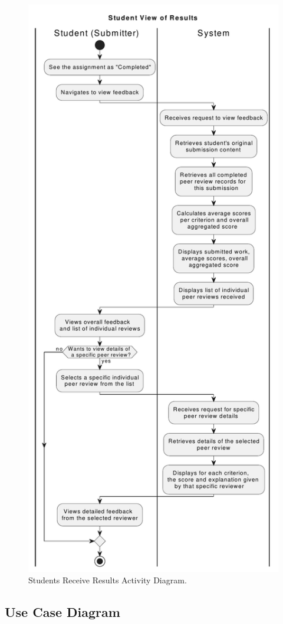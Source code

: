 \begin{figure}[h]
    \centering
    \includegraphics[width=0.6\linewidth]{SRS/imgs/7_StudentResult.pdf}
    \caption{Students Receive Results Activity Diagram.}
    \label{fig:StudentsResultsAD}
\end{figure}

\clearpage

\vspace*{1cm}

\subsection{Use Case Diagram}

